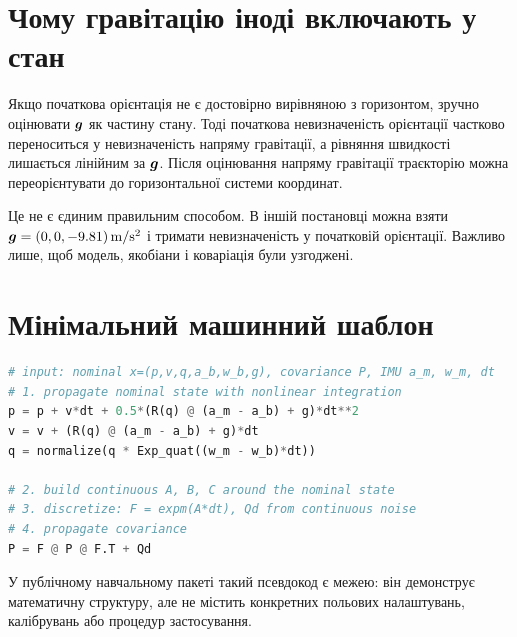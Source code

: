 \section{Чому гравітацію іноді включають у стан}

Якщо початкова орієнтація не є достовірно вирівняною з горизонтом, зручно оцінювати $\bm{g}$ як частину стану. Тоді початкова невизначеність орієнтації частково переноситься у невизначеність напряму гравітації, а рівняння швидкості лишається лінійним за $\bm{g}$. Після оцінювання напряму гравітації траєкторію можна переорієнтувати до горизонтальної системи координат.

Це не є єдиним правильним способом. В іншій постановці можна взяти $\bm{g}=(0,0,-9.81)\,\mathrm{m/s^2}$ і тримати невизначеність у початковій орієнтації. Важливо лише, щоб модель, якобіани і коваріація були узгоджені.

\section{Мінімальний машинний шаблон}

\begin{lstlisting}[language=Python,caption={Псевдокод ESKF-прогнозу. Це не прив'язано до конкретного пакета.}]
# input: nominal x=(p,v,q,a_b,w_b,g), covariance P, IMU a_m, w_m, dt
# 1. propagate nominal state with nonlinear integration
p = p + v*dt + 0.5*(R(q) @ (a_m - a_b) + g)*dt**2
v = v + (R(q) @ (a_m - a_b) + g)*dt
q = normalize(q * Exp_quat((w_m - w_b)*dt))

# 2. build continuous A, B, C around the nominal state
# 3. discretize: F = expm(A*dt), Qd from continuous noise
# 4. propagate covariance
P = F @ P @ F.T + Qd
\end{lstlisting}

У публічному навчальному пакеті такий псевдокод є межею: він демонструє математичну структуру, але не містить конкретних польових налаштувань, калібрувань або процедур застосування.
